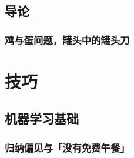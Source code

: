 \documentclass[12pt,a4paper]{report}
\newcommand{\cc}[2]{#1}
\newcommand{\cc}[2]{#2}
\theoremstyle{examples} \newtheorem{example}{Example}[section]
\begin{document}

\tableofcontents
\adjustmtc

\setcounter{chapter}{-1}
\chapter{\cc{导论}{Introduction}}

	\minitoc
	\section{\cc{鸡与蛋问题，罐头中的罐头刀}{Chicken-and-egg problem}}

\part{\cc{技巧}{Techniques}}

\chapter{\cc{机器学习基础}{Machine learning basics}}

	\minitoc
	\section{\cc{归纳偏见与「没有免费午餐」}{Inductive bias and ``no free lunch'' theorem}}
\end{document}
